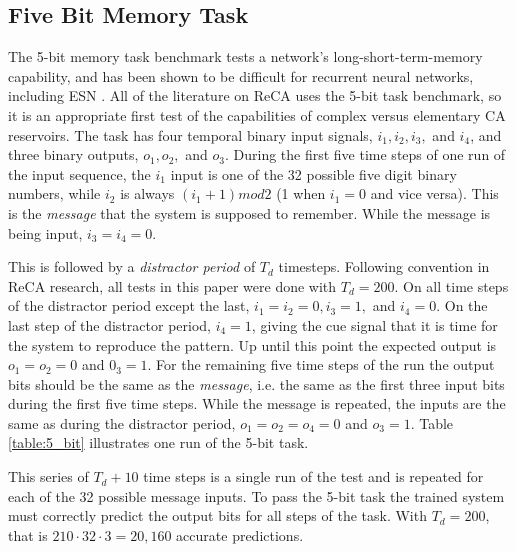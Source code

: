 \documentclass{elsarticle}
\begin{document}
\begin{multicols}{2}
\subsection{Five Bit Memory Task}\label{5_bit}
The 5-bit memory task benchmark tests a network's long-short-term-memory 
capability, and has been shown to be difficult for recurrent neural networks, 
    including ESN \cite{hochreiter1997long}\cite{jaeger2012long}. All of the 
    literature on ReCA uses the 5-bit task benchmark, so it is an appropriate 
    first test of the capabilities of complex versus elementary CA reservoirs.  
    The task has four temporal binary input signals, $i_1, i_2, i_3,$ and 
    $i_4$, and three binary outputs, $o_1, o_2,$ and $o_3$.  During the
first five time steps of one run of the input sequence, the $i_1$ input is one 
of the 32 possible five digit binary numbers, while $i_2$ is always $(i_1 + 1) 
    mod 2$ (1 when $i_1 = 0$ and vice versa). This is the \textit{message} that 
    the system is supposed to remember. While the message is being input, $i_3 
    = i_4 = 0$.  \par  This is followed by a \textit{distractor period} of 
    $T_d$ timesteps.  Following convention in ReCA research, all tests in this 
    paper were done with $T_d = 200$.  On all time steps of the distractor 
    period except the last, $i_1 = i_2 = 0, i_3 = 1, $ and $i_4 = 0$. On the 
    last step of the distractor period, $i_4 = 1$, giving the cue signal that 
    it is time for the system to reproduce the pattern. Up until this point the 
    expected output is $o_1 = o_2 = 0 $ and $0_3 = 1$. For the remaining five 
    time steps of the run the output bits should be the same as the 
    \textit{message}, i.e.  the same as the first three input bits during the 
    first five time steps.  While the message is repeated, the inputs are the 
    same as during the distractor period, $o_1 = o_2 = o_4 = 0$ and $o_3 = 1$.  
    Table \ref{table:5_bit} illustrates one run of the 5-bit task. \par
    This series of $T_d + 10$ time steps is a single run of the test and is 
    repeated for each of the 32 possible message inputs. To pass the 5-bit task 
    the trained system must correctly predict the output bits for all steps of 
    the task. With $T_d = 200$, that is $210 \cdot 32 \cdot 3 = 20,160$ accurate 
    predictions.


\end{multicols}
\end{document}
